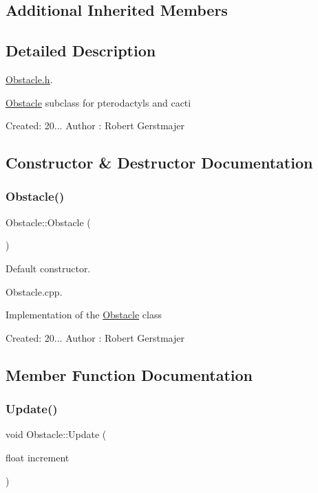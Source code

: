 \subsection*{Additional Inherited Members}


\subsection{Detailed Description}
\mbox{\hyperlink{_obstacle_8h_source}{Obstacle.\+h}}. 

\mbox{\hyperlink{class_obstacle}{Obstacle}} subclass for pterodactyls and cacti

Created\+: 20... Author \+: Robert Gerstmajer 

\subsection{Constructor \& Destructor Documentation}
\mbox{\label{class_obstacle_a8f734072321fa06a7b7dae2d5f50f352}} 
\subsubsection{\texorpdfstring{Obstacle()}{Obstacle()}}
{\footnotesize\ttfamily Obstacle\+::\+Obstacle (\begin{DoxyParamCaption}{ }\end{DoxyParamCaption})}



Default constructor. 

Obstacle.\+cpp.

Implementation of the \mbox{\hyperlink{class_obstacle}{Obstacle}} class

Created\+: 20... Author \+: Robert Gerstmajer 

\subsection{Member Function Documentation}
\mbox{\label{class_obstacle_ad7bd00104a2c53cfb7421ca5986644af}} 
\subsubsection{\texorpdfstring{Update()}{Update()}}
{\footnotesize\ttfamily void Obstacle\+::\+Update (\begin{DoxyParamCaption}\item[{float}]{increment }\end{DoxyParamCaption})\hspace{0.3cm}{\ttfamily [pure virtual]}}



